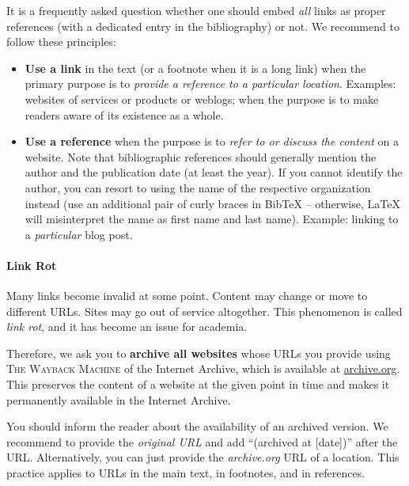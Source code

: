 It is a frequently asked question whether one should embed \emph{all} links as proper references (with a dedicated entry in the bibliography) or not. We recommend to follow these principles:
\begin{itemize}
  \item \textbf{Use a link} in the text (or a footnote when it is a long link) when the primary purpose is to \emph{provide a reference to a particular location}. Examples: websites of services or products or weblogs; when the purpose is to make readers aware of its existence as a whole.
  \item \textbf{Use a reference} when the purpose is to \emph{refer to or discuss the content} on a website. Note that bibliographic references should generally mention the author and the publication date (at least the year). If you cannot identify the author, you can resort to using the name of the respective organization instead (use an additional pair of curly braces in BibTeX -- otherwise, LaTeX will misinterpret the name as first name and last name). Example: linking to a \emph{particular} blog post.
\end{itemize}

\paragraph{Link Rot}

Many links become invalid at some point.
Content may change or move to different URLs. Sites may go out of service altogether. This phenomenon is called \emph{link rot}, and it has become an issue for academia.

Therefore, we ask you to \textbf{archive all websites} whose URLs you provide using \textsc{The Wayback Machine} of the Internet Archive, which is available at \url{archive.org}.
This preserves the content of a website at the given point in time and makes it permanently available in the Internet Archive.

You should inform the reader about the availability of an archived version.
We recommend to provide the \emph{original URL} and add ``(archived at [date])'' after the URL.%
Alternatively, you can just provide the \emph{archive.org} URL of a location.
This practice applies to URLs in the main text, in footnotes, and in references.

